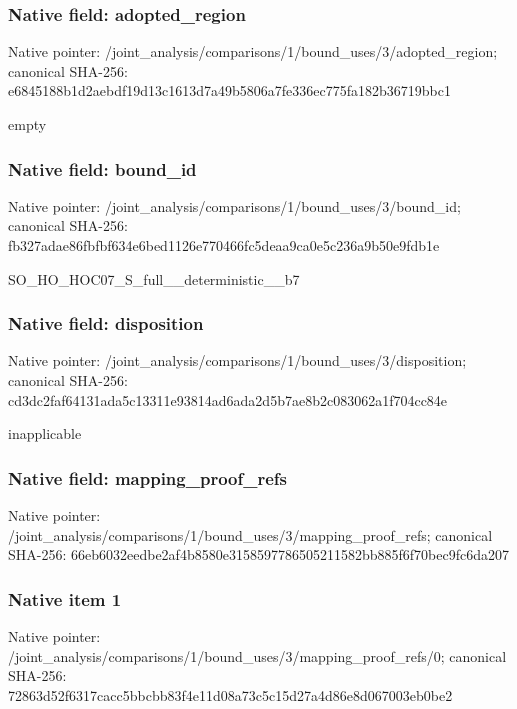 \documentclass[10pt,a4paper]{article}
\begin{document}
\subsubsection{Native field: adopted\_\allowbreak{}region}
Native pointer: /joint\_\allowbreak{}analysis/comparisons/1/bound\_\allowbreak{}uses/3/adopted\_\allowbreak{}region; canonical SHA-256: e6845188b1d2aebdf19d13c1613d7a49b5806a7fe336ec775fa182b36719bbc1

\begingroup\raggedright\sloppy empty\par\endgroup

\subsubsection{Native field: bound\_\allowbreak{}id}
Native pointer: /joint\_\allowbreak{}analysis/comparisons/1/bound\_\allowbreak{}uses/3/bound\_\allowbreak{}id; canonical SHA-256: fb327adae86fbfbf634e6bed1126e770466fc5deaa9ca0e5c236a9b50e9fdb1e

\begingroup\raggedright\sloppy SO\_\allowbreak{}HO\_\allowbreak{}HOC07\_\allowbreak{}S\_\allowbreak{}full\_\allowbreak{}\_\allowbreak{}deterministic\_\allowbreak{}\_\allowbreak{}b7\par\endgroup

\subsubsection{Native field: disposition}
Native pointer: /joint\_\allowbreak{}analysis/comparisons/1/bound\_\allowbreak{}uses/3/disposition; canonical SHA-256: cd3dc2faf64131ada5c13311e93814ad6ada2d5b7ae8b2c083062a1f704cc84e

\begingroup\raggedright\sloppy inapplicable\par\endgroup

\subsubsection{Native field: mapping\_\allowbreak{}proof\_\allowbreak{}refs}
Native pointer: /joint\_\allowbreak{}analysis/comparisons/1/bound\_\allowbreak{}uses/3/mapping\_\allowbreak{}proof\_\allowbreak{}refs; canonical SHA-256: 66eb6032eedbe2af4b8580e3158597786505211582bb885f6f70bec9fc6da207

\subsubsection{Native item 1}
Native pointer: /joint\_\allowbreak{}analysis/comparisons/1/bound\_\allowbreak{}uses/3/mapping\_\allowbreak{}proof\_\allowbreak{}refs/0; canonical SHA-256: 72863d52f6317cacc5bbcbb83f4e11d08a73c5c15d27a4d86e8d067003eb0be2
\end{document}

